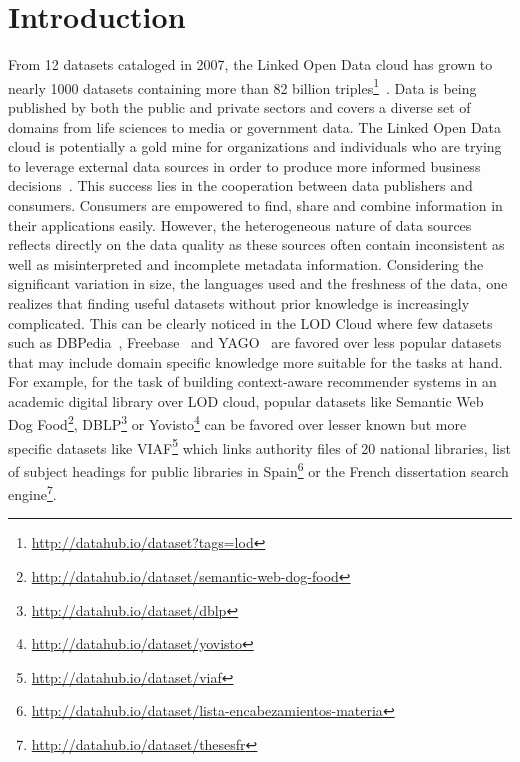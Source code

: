 \documentclass[runningheads,a4paper]{llncs}
\begin{document}

\section{Introduction}
\label{sec:introduction}
From 12 datasets cataloged in 2007, the Linked Open Data cloud has grown to nearly 1000 datasets containing more than 82 billion triples\footnote{\url{http://datahub.io/dataset?tags=lod}}~\cite{BizerHeath2009}. Data is being published by both the public and private sectors and covers a diverse set of domains from life sciences to media or government data. The Linked Open Data cloud is potentially a gold mine for organizations and individuals who are trying to leverage external data sources in order to produce more informed business decisions~\cite{Boyd2011}. This success lies in the cooperation between data publishers and consumers. Consumers are empowered to find, share and combine information in their applications easily. However, the heterogeneous nature of data sources reflects directly on the data quality as these sources often contain inconsistent as well as misinterpreted and incomplete metadata information. Considering the significant variation in size, the languages used and the freshness of the data, one realizes that finding useful datasets without prior knowledge is increasingly complicated. This can be clearly noticed in the LOD Cloud where few datasets such as DBPedia~\cite{Bizer:2009:DCP:1640541.1640848}, Freebase~\cite{Bollacker:2008:FCC:1376616.1376746} and YAGO~\cite{Suchanek:2007:YCS:1242572.1242667} are favored over less popular datasets that may include domain specific knowledge more suitable for the tasks at hand. For example, for the task of building context-aware recommender systems in an academic digital library over LOD cloud, popular datasets like Semantic Web Dog Food\footnote{\url{http://datahub.io/dataset/semantic-web-dog-food}}, DBLP\footnote{\url{http://datahub.io/dataset/dblp}} or Yovisto\footnote{\url{http://datahub.io/dataset/yovisto}} can be favored over lesser known but more specific datasets like VIAF\footnote{\url{http://datahub.io/dataset/viaf}} which links authority files of 20 national libraries, list of subject headings for public libraries in Spain\footnote{\url{http://datahub.io/dataset/lista-encabezamientos-materia}} or the French dissertation search engine\footnote{\url{http://datahub.io/dataset/thesesfr}}.
\end{document}

